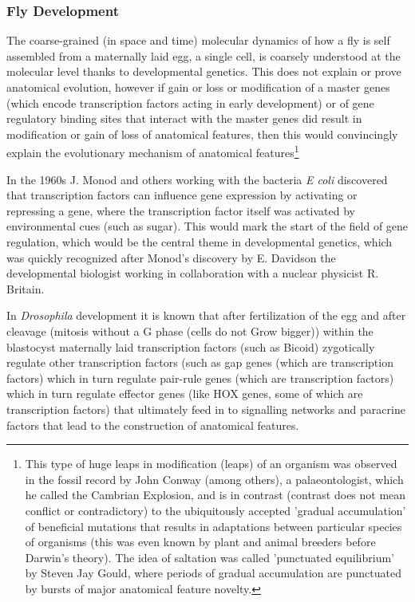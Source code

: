 \subsubsection{Fly Development}

The coarse-grained (in space and time) molecular dynamics of how a fly is self assembled from a maternally laid egg, a single cell, is coarsely understood at the molecular level thanks to developmental genetics.  This does not explain or prove anatomical evolution, however if gain or loss or modification of a master genes (which encode transcription factors acting in early development) or of gene regulatory binding sites that interact with the master genes did result in modification or gain of loss of anatomical features, then this would convincingly explain the evolutionary mechanism of anatomical features\footnote{This type of huge leaps in modification (leaps) of an organism was observed in the fossil record by John Conway (among others), a palaeontologist, which he called the Cambrian Explosion, and is in contrast (contrast does not mean conflict or contradictory) to the ubiquitously accepted 'gradual accumulation' of beneficial mutations that results in adaptations between particular species of organisms (this was even known by plant and animal breeders before Darwin's theory).  The idea of saltation was called 'punctuated equilibrium' by Steven Jay Gould, where periods of gradual accumulation are punctuated by bursts of major anatomical feature novelty.}  

In the 1960s J. Monod and others working with the bacteria \textit{E coli} discovered that transcription factors can influence gene expression by activating or repressing a gene, where the transcription factor itself was activated by environmental cues (such as sugar)\cite{pmid13718526}.  This would mark the start of the field of gene regulation, which would be the central theme in developmental genetics, which was quickly recognized after Monod's discovery by E. Davidson the developmental biologist working in collaboration with a nuclear physicist R. Britain\cite{pmid5160087}.  


In \textit{Drosophila} development it is known that after fertilization of the egg and after cleavage (mitosis without a G phase (cells do not Grow bigger)) within the blastocyst maternally laid transcription factors (such as Bicoid) zygotically regulate other transcription factors (such as gap genes (which are transcription factors) which in turn regulate pair-rule genes (which are transcription factors) which in turn regulate effector genes (like HOX genes, some of which are transcription factors) that ultimately feed in to signalling networks and paracrine factors that lead to the construction of anatomical features.  

